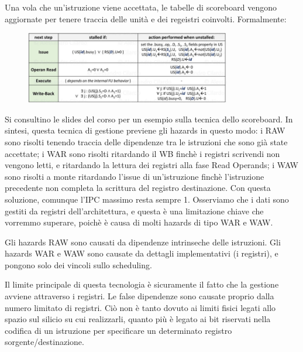 \noindent Una vola che un'istruzione viene accettata, le tabelle di scoreboard vengono aggiornate per tenere traccia delle unità e dei regeistri coinvolti. Formalmente:

\begin{figure}[ht]
    \centering
    \includegraphics[width=0.8\textwidth]{fig/chapter_2/transition_rules.png}
\end{figure}

\noindent Si consultino le slides del corso per un esempio sulla tecnica dello scoreboard. In sintesi, questa tecnica di gestione previene gli hazards in questo modo: i RAW sono risolti tenendo traccia delle dipendenze tra le istruzioni che sono già state accettate; i WAR sono risolti ritardando il WB finchè i registri scrivendi non vengono letti, e ritardando la lettura dei registri alla fase Read Operands; i WAW sono risolti a monte ritardando l'issue di un'istruzione finchè l'istruzione precedente non completa la scrittura del registro destinazione. Con questa soluzione, comunque l'IPC massimo resta sempre 1. Osserviamo che i dati sono gestiti da registri dell'architettura, e questa è una limitazione chiave che vorremmo superare, poichè è causa di molti hazards di tipo WAR e WAW. 

\begin{warn}
    Gli hazards RAW sono causati da dipendenze intrinseche delle istruzioni. Gli hazards WAR e WAW sono causate da dettagli implementativi (i registri), e pongono solo dei vincoli sullo scheduling.
\end{warn}

\noindent Il limite principale di questa tecnologia è sicuramente il fatto che la gestione avviene attraverso i registri. Le false dipendenze sono causate proprio dalla numero limitato di registri. Ciò non è tanto dovuto ai limiti fisici legati allo spazio sul silicio su cui realizzarli, quanto più è legato ai bit riservati nella codifica di un istruzione per specificare un determinato registro sorgente/destinazione. 